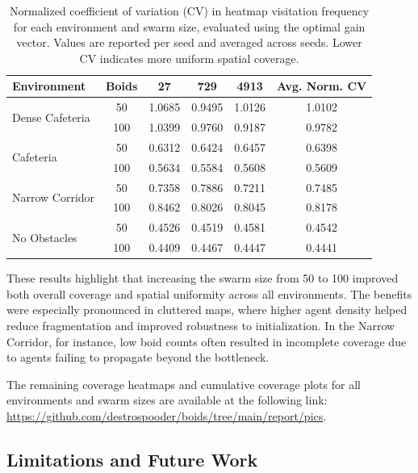 \documentclass[12pt]{article}
\begin{document}
\begin{table}[H]
    \footnotesize
    \centering
    \begin{tabular}{|l|c|c|c|c|c|}
    \hline
    \textbf{Environment} & \textbf{Boids} & \textbf{27} & \textbf{729} & \textbf{4913} & \textbf{Avg. Norm. CV} \\
    \hline
    \multirow{2}{*}{Dense Cafeteria}    
        & 50  & 1.0685 & 0.9495 & 1.0126 & 1.0102 \\
        & 100 & 1.0399 & 0.9760 & 0.9187 & 0.9782 \\
    \hline
    \multirow{2}{*}{Cafeteria}          
        & 50  & 0.6312 & 0.6424 & 0.6457 & 0.6398 \\
        & 100 & 0.5634 & 0.5584 & 0.5608 & 0.5609 \\
    \hline
    \multirow{2}{*}{Narrow Corridor}    
        & 50  & 0.7358 & 0.7886 & 0.7211 & 0.7485 \\
        & 100 & 0.8462 & 0.8026 & 0.8045 & 0.8178 \\
    \hline
    \multirow{2}{*}{No Obstacles}       
        & 50  & 0.4526 & 0.4519 & 0.4581 & 0.4542 \\
        & 100 & 0.4409 & 0.4467 & 0.4447 & 0.4441 \\
    \hline
    \end{tabular}
    \caption{Normalized coefficient of variation (CV) in heatmap visitation frequency for each environment and swarm size, evaluated using the optimal gain vector. Values are reported per seed and averaged across seeds. Lower CV indicates more uniform spatial coverage.}
    \label{tab:normalized_cv}
\end{table}

These results highlight that increasing the swarm size from 50 to 100 improved both overall coverage and spatial uniformity across all environments. The benefits were especially pronounced in cluttered maps, where higher agent density helped reduce fragmentation and improved robustness to initialization. In the Narrow Corridor, for instance, low boid counts often resulted in incomplete coverage due to agents failing to propagate beyond the bottleneck.

The remaining coverage heatmaps and cumulative coverage plots for all environments and swarm sizes are available at the following link:
\url{https://github.com/destrospooder/boids/tree/main/report/pics}.

\subsection{Limitations and Future Work}
\end{document}
